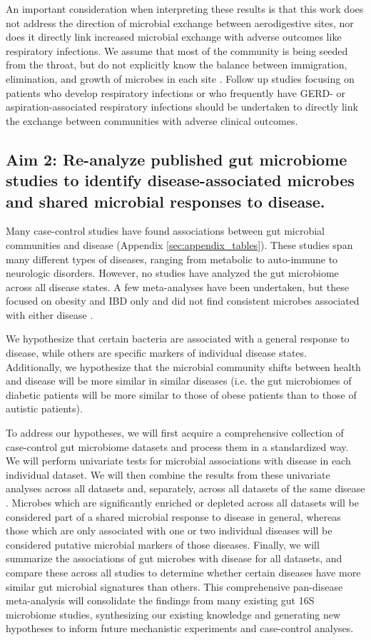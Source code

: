 \documentclass[12pt]{article}
\begin{document}
An important consideration when interpreting these results is that
this work does not address the direction of microbial exchange between 
aerodigestive sites, nor does it directly link increased microbial 
exchange with adverse outcomes like respiratory infections.
We assume that most of the community is being seeded from the throat, 
but do not explicitly know the balance between immigration, elimination, and 
growth of microbes in each site \cite{bassis-source-2015}.
Follow up studies focusing on patients who develop respiratory 
infections or who frequently have GERD- or aspiration-associated 
respiratory infections should be undertaken to directly link the exchange
between communities with adverse clinical outcomes. 

\subsection{Aim 2: Re-analyze published gut	microbiome studies to identify disease-associated microbes and shared microbial responses to disease.}\label{sec:aim2}
Many case-control studies have found associations between gut microbial 
communities and disease (Appendix \ref{sec:appendix_tables}). These studies 
span many different types of diseases, ranging
from metabolic to auto-immune to neurologic disorders. However, no studies have analyzed 
the gut microbiome across all disease states. A few meta-analyses have
been undertaken, but these focused on obesity and IBD only and
did not find consistent microbes associated with either disease \cite{sze-signal-2016, walters-ob_meta-2014}.

We hypothesize that certain bacteria are associated with a general response
to disease, while others are specific markers of individual disease states.
Additionally, we hypothesize that the microbial community shifts between
health and disease will be more similar in similar diseases (i.e. the
gut microbiomes of diabetic patients will be more similar to those of obese patients
than to those of autistic patients).

To address our hypotheses, we will first acquire a comprehensive
collection of case-control gut microbiome datasets and process them
in a standardized way. We will perform univariate tests for 
microbial associations with disease in each individual dataset. 
We will then combine the results from these univariate analyses across all datasets and,
separately, across all datasets of the same disease \cite{zavkin-ztest-2011}.
Microbes which are significantly enriched or depleted across 
all datasets will be considered part of a shared microbial response to
disease in general, whereas those which are only associated with one or two
individual diseases will be considered putative microbial markers of those diseases.
Finally, we will summarize the associations of gut microbes with disease
for all datasets, and compare these across all studies to determine whether certain diseases have 
more similar gut microbial signatures than others.
This comprehensive pan-disease meta-analysis will
consolidate the findings from many existing gut 16S microbiome studies,
synthesizing our existing knowledge and generating new hypotheses to
inform future mechanistic experiments and case-control analyses.
\end{document}
